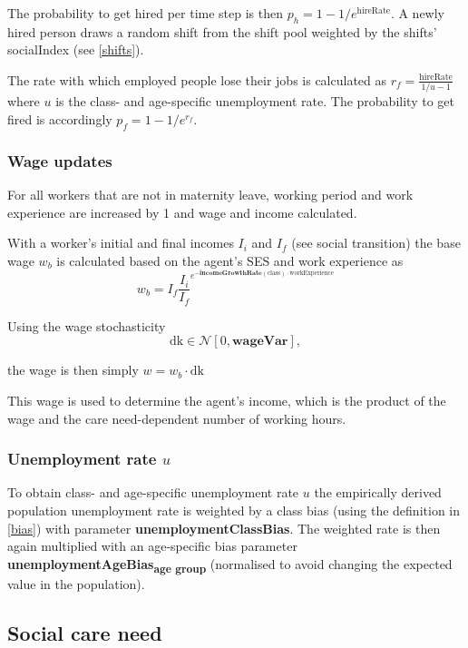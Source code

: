 \documentclass{article}
\newcommand{\marginnote}[1]{\protect\marginpar{\small\texttt{#1}}}
\begin{document}
The probability to get hired per time step is then $p_h=1-1/e^\textrm{hireRate}$. A newly hired person draws a random shift from the shift pool weighted by the shifts' \textsf{socialIndex} (see \ref{shifts}).

The rate with which employed people lose their jobs is calculated as $r_f = \frac{\textrm{hireRate}}{1/u - 1}$ where $u$ is the class- and age-specific unemployment rate. The probability to get fired is accordingly $p_f = 1-1/e^{r_f}$. 


\subsubsection*{Wage updates}

For all workers that are not in maternity leave, working period and work experience are increased by 1 and wage and income calculated.

With a worker's initial and final incomes $I_i$ and $I_f$ (see social transition) the base wage $w_b$ is calculated based on the agent's SES and work experience as
\[
w_b = I_f \frac{I_i}{I_f}^{e^{-\mathbf{incomeGrowthRate}(\mathrm{class})\cdot \mathrm{workExperience}}}
\]

Using the wage stochasticity
\[
\mathrm{dk} \in \mathcal{N}[0, \mathbf{wageVar}],
\]

the wage is then simply $w=w_b \cdot \mathrm{dk}$

This wage is used to determine the agent's income, which is the product of the wage and the care need-dependent number of working hours.

\subsubsection*{Unemployment rate $u$}

To obtain class- and age-specific unemployment rate $u$ the empirically derived population unemployment rate is weighted by a class bias (using the definition in \ref{bias}) with parameter \textbf{unemploymentClassBias}. The weighted rate is then again multiplied with an age-specific bias parameter \textbf{unemploymentAgeBias}\textsubscript{\textbf{age group}} (normalised to avoid changing the expected value in the population).

\subsection{Social care need \marginnote{SocialCare.jl}}
\end{document}
